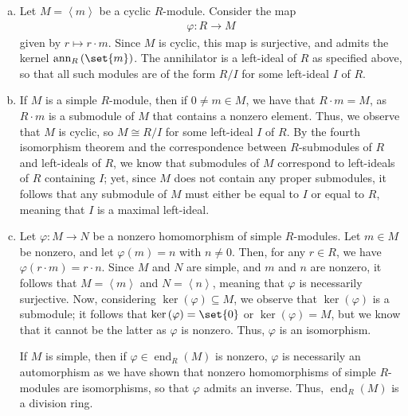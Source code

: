 \documentclass[10pt]{mypackage}
\begin{document}
\begin{solution}\hfill
  \begin{enumerate}[(a)]
    \item Let $M = \left\langle m \right\rangle$ be a cyclic $R$-module. Consider the map
      \begin{align*}
        \varphi\colon R\rightarrow M
      \end{align*}
      given by $r\mapsto r\cdot m$. Since $M$ is cyclic, this map is surjective, and admits the kernel $\operatorname{ann}_R\left( \set{m} \right)$. The annihilator is a left-ideal of $R$ as specified above, so that all such modules are of the form $R/I$ for some left-ideal $I$ of $R$.
    \item If $M$ is a simple $R$-module, then if $0\neq m\in M$, we have that $R\cdot m = M$, as $R\cdot m$ is a submodule of $M$ that contains a nonzero element. Thus, we observe that $M$ is cyclic, so $M \cong R/I$ for some left-ideal $I$ of $R$. By the fourth isomorphism theorem and the correspondence between $R$-submodules of $R$ and left-ideals of $R$, we know that submodules of $M$ correspond to left-ideals of $R$ containing $I$; yet, since $M$ does not contain any proper submodules, it follows that any submodule of $M$ must either be equal to $I$ or equal to $R$, meaning that $I$ is a maximal left-ideal.
    \item Let $\varphi\colon M\rightarrow N$ be a nonzero homomorphism of simple $R$-modules. Let $m\in M$ be nonzero, and let $\varphi(m) = n$ with $n\neq 0$. Then, for any $r\in R$, we have $\varphi\left( r\cdot m \right) = r\cdot n$. Since $M$ and $N$ are simple, and $m$ and $n$ are nonzero, it follows that $M = \left\langle m \right\rangle$ and $N = \left\langle n \right\rangle$, meaning that $\varphi$ is necessarily surjective. Now, considering $\ker\left( \varphi \right)\subseteq M$, we observe that $\ker\left( \varphi \right)$ is a submodule; it follows that $\ker\left( \varphi \right) = \set{0}$ or $\ker\left( \varphi \right) = M$, but we know that it cannot be the latter as $\varphi$ is nonzero. Thus, $\varphi$ is an isomorphism.\newline

      If $M$ is simple, then if $\varphi\in \operatorname{end}_R\left( M \right)$ is nonzero, $\varphi$ is necessarily an automorphism as we have shown that nonzero homomorphisms of simple $R$-modules are isomorphisms, so that $\varphi$ admits an inverse. Thus, $ \operatorname{end}_R\left( M \right) $ is a division ring.
  \end{enumerate}
\end{solution}
\end{document}
